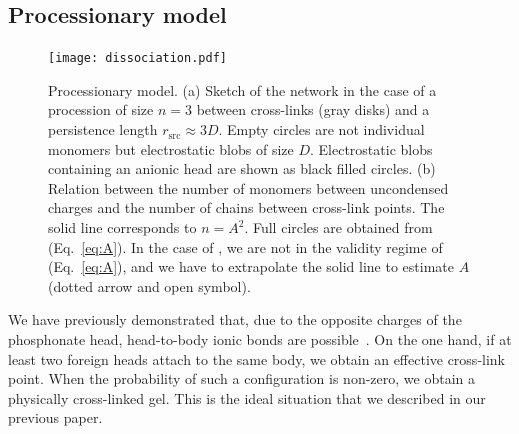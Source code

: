 \documentclass[journal=jacsat,manuscript=article]{achemso}
\begin{document}

\subsection{Processionary model}

\begin{figure}
\texttt{[image: dissociation.pdf]}
\caption{Processionary model. (a) Sketch of the network in the case of a procession of size $n=3$ between cross-links (gray disks) and a persistence length $r_\mathrm{src}\approx 3D$. Empty circles are not individual monomers but electrostatic blobs of size $D$. Electrostatic blobs containing an anionic head are shown as black filled circles. (b) Relation between the number of monomers between uncondensed charges and the number of chains between cross-link points. The solid line corresponds to $n = A^2$. Full circles are obtained from (Eq.~\ref{eq:A}). In the case of , we are not in the validity regime of (Eq.~\ref{eq:A}), and we have to extrapolate the solid line to estimate $A$ (dotted arrow and open symbol).}
\label{fig:dissociation}
\end{figure}

We have previously demonstrated that, due to the opposite charges of the phosphonate head, head-to-body ionic bonds are possible~\cite{Srour2014}. On the one hand, if at least two foreign heads attach to the same body, we obtain an effective cross-link point. When the probability of such a configuration is non-zero, we obtain a physically cross-linked gel. This is the ideal situation that we described in our previous paper.
\end{document}
